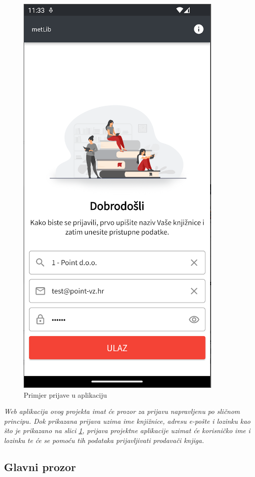 	\begin{figure}[H]
		\includegraphics[scale=0.4]{slike/Login.PNG} %
		\centering
		\caption{Primjer prijave u aplikaciju}
		\label{fig:prijava}
	\end{figure}
	
	\textit{Web aplikacija ovog projekta imat će prozor za prijavu napravljenu po sličnom principu. Dok prikazana prijava uzima ime knjižnice, adresu e-pošte i lozinku kao što je prikazano na slici \ref{fig:prijava}, prijava projektne aplikacije uzimat će korisničko ime i lozinku te će se pomoću tih podataka prijavljivati prodavači knjiga.}
		
	\subsection{Glavni prozor}
	
